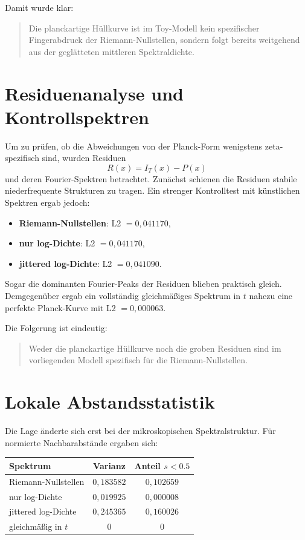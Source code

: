 \documentclass[11pt,a4paper]{article}
\theoremstyle{definition}
\theoremstyle{remark}
\begin{document}
	Damit wurde klar:
	\begin{quote}
		Die planckartige Hüllkurve ist im Toy-Modell kein spezifischer Fingerabdruck der Riemann-Nullstellen, sondern folgt bereits weitgehend aus der geglätteten mittleren Spektraldichte.
	\end{quote}
	
	\section{Residuenanalyse und Kontrollspektren}
	
	Um zu prüfen, ob die Abweichungen von der Planck-Form wenigstens zeta-spezifisch sind, wurden Residuen
	\[
	R(x)=I_T(x)-P(x)
	\]
	und deren Fourier-Spektren betrachtet. Zunächst schienen die Residuen stabile niederfrequente Strukturen zu tragen. Ein strenger Kontrolltest mit künstlichen Spektren ergab jedoch:
	\begin{itemize}[leftmargin=1.5em]
		\item \textbf{Riemann-Nullstellen}: L2 $=0{,}041170$,
		\item \textbf{nur log-Dichte}: L2 $=0{,}041170$,
		\item \textbf{jittered log-Dichte}: L2 $=0{,}041090$.
	\end{itemize}
	
	Sogar die dominanten Fourier-Peaks der Residuen blieben praktisch gleich. Demgegenüber ergab ein vollständig gleichmäßiges Spektrum in $t$ nahezu eine perfekte Planck-Kurve mit L2 $=0{,}000063$.
	
	Die Folgerung ist eindeutig:
	\begin{quote}
		Weder die planckartige Hüllkurve noch die groben Residuen sind im vorliegenden Modell spezifisch für die Riemann-Nullstellen.
	\end{quote}
	
	\section{Lokale Abstandsstatistik}
	
	Die Lage änderte sich erst bei der mikroskopischen Spektralstruktur. Für normierte Nachbarabstände ergaben sich:
	\begin{center}
		\begin{tabular}{lcc}
			\toprule
			Spektrum & Varianz & Anteil $s<0.5$ \\
			\midrule
			Riemann-Nullstellen    & $0{,}183582$ & $0{,}102659$ \\
			nur log-Dichte         & $0{,}019925$ & $0{,}000008$ \\
			jittered log-Dichte    & $0{,}245365$ & $0{,}160026$ \\
			gleichmäßig in $t$     & $0$          & $0$ \\
			\bottomrule
		\end{tabular}
	\end{center}
	
\end{document}
